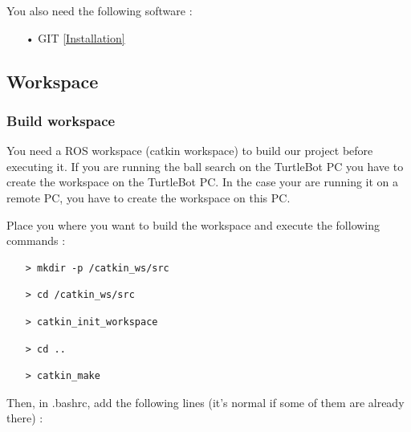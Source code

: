 \documentclass[10pt,a4paper]{article}
\begin{document}
You also need the following software :

\begin{itemize}
\item[•] GIT \href{https://git-scm.com/download/linux}{[Installation]} 
\end{itemize}

\subsection{Workspace}

\subsubsection{Build workspace}

You need a ROS workspace (catkin workspace) to build our project before executing it. If you are running the ball search on the TurtleBot PC you have to create the workspace on the TurtleBot PC. In the case your are running it on a remote PC, you have to create the workspace on this PC.\

Place you where you want to build the workspace and execute the following commands :

\begin{itemize}
\item[]  \begin{verbatim}> mkdir -p /catkin_ws/src \end{verbatim}
\item[]  \begin{verbatim}> cd /catkin_ws/src \end{verbatim}
\item[]  \begin{verbatim}> catkin_init_workspace \end{verbatim}
\item[]  \begin{verbatim}> cd .. \end{verbatim}
\item[]  \begin{verbatim}> catkin_make \end{verbatim}
\end{itemize}

Then, in .bashrc, add the following lines (it's normal if some of them are already there) :
\end{document}
